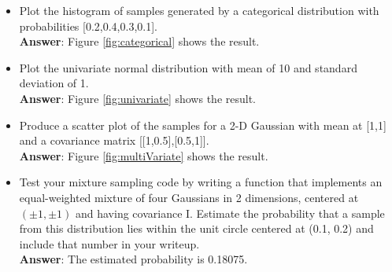 \documentclass[paper=a4, fontsize=11pt]{scrartcl} %
\numberwithin{equation}{section} %
\numberwithin{figure}{section} %
\numberwithin{table}{section} %
\begin{document}
\begin{itemize}
	\item Plot the histogram of samples generated by a categorical distribution with probabilities [0.2,0.4,0.3,0.1].
    \\ \textbf{Answer}: Figure \ref{fig:categorical} shows the result.
	
 	\item Plot the univariate normal distribution with mean of 10 and standard deviation of 1.
    \\ \textbf{Answer}: Figure \ref{fig:univariate} shows the result.
 	
 	\item Produce a scatter plot of the samples for a 2-D Gaussian with mean at [1,1] and a covariance matrix [[1,0.5],[0.5,1]].
    \\ \textbf{Answer}: Figure \ref{fig:multiVariate} shows the result.
 	
 	\item Test your mixture sampling code by writing a function that implements an equal-weighted mixture of four Gaussians in 2 dimensions, centered at $ (\pm 1, \pm 1) $ and having covariance I. Estimate the probability that a sample from this distribution lies within the unit circle centered at (0.1, 0.2) and include that number in your writeup.
 	\\ \textbf{Answer}: The estimated probability is 0.18075.
 	

\end{itemize}
\end{document}
